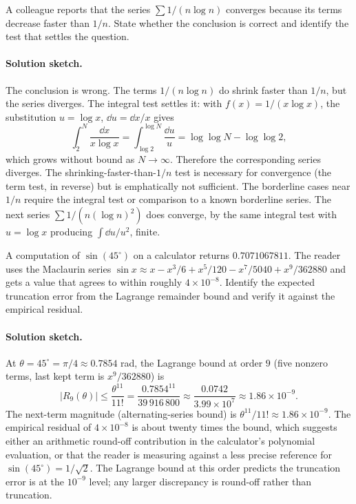 \begin{exercise}
A colleague reports that the series $\sum 1/(n \log n)$ converges
because its terms decrease faster than $1/n$. State whether the
conclusion is correct and identify the test that settles the question.

\paragraph{Solution sketch.} The conclusion is wrong. The terms
$1/(n \log n)$ do shrink faster than $1/n$, but the series diverges.
The integral test settles it: with $f(x) = 1/(x \log x)$, the
substitution $u = \log x$, $\dd u = \dd x / x$ gives
\[
\int_{2}^{N} \frac{\dd x}{x \log x} = \int_{\log 2}^{\log N}
\frac{\dd u}{u} = \log \log N - \log \log 2,
\]
which grows without bound as $N \to \infty$. Therefore the
corresponding series diverges. The shrinking-faster-than-$1/n$ test
is necessary for convergence (the term test, in reverse) but is
emphatically not sufficient. The borderline cases near $1/n$ require
the integral test or comparison to a known borderline series. The
next series $\sum 1/(n (\log n)^{2})$ does converge, by the same
integral test with $u = \log x$ producing $\int \dd u/u^{2}$, finite.
\end{exercise}

\begin{exercise}
A computation of $\sin(45^{\circ})$ on a calculator returns
$0.7071067811$. The reader uses the Maclaurin series $\sin x \approx x
- x^{3}/6 + x^{5}/120 - x^{7}/5040 + x^{9}/362880$ and gets a value
that agrees to within roughly $4 \times 10^{-8}$. Identify the
expected truncation error from the Lagrange remainder bound and
verify it against the empirical residual.

\paragraph{Solution sketch.} At $\theta = 45^{\circ} = \pi/4 \approx
0.7854$ rad, the Lagrange bound at order $9$ (five nonzero terms,
last kept term is $x^{9}/362880$) is
\[
|R_{9}(\theta)| \leq \frac{\theta^{11}}{11!} =
\frac{0.7854^{11}}{39\,916\,800} \approx \frac{0.0742}{3.99 \times
10^{7}} \approx 1.86 \times 10^{-9}.
\]
The next-term magnitude (alternating-series bound) is $\theta^{11}/11!
\approx 1.86 \times 10^{-9}$. The empirical residual of $4 \times
10^{-8}$ is about twenty times the bound, which suggests either an
arithmetic round-off contribution in the calculator's polynomial
evaluation, or that the reader is measuring against a less precise
reference for $\sin(45^{\circ}) = 1/\sqrt{2}$. The Lagrange bound at
this order predicts the truncation error is at the $10^{-9}$ level;
any larger discrepancy is round-off rather than truncation.
\end{exercise}

